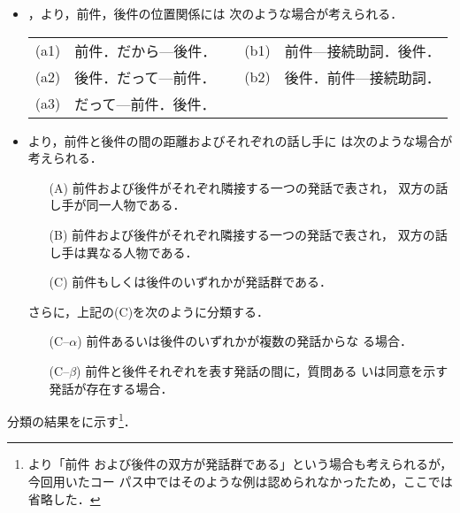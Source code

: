 \begin{itemize}
 \item {}，より，前件，後件の位置関係には
       次のような場合が考えられる．

       \begin{center}
	\begin{tabular}{rlcrl}
	 (a1) & 前件．だから---後件． & & (b1) & 前件---接続助詞．後件．
	 \\
	 (a2) & 後件．だって---前件． & & (b2) & 後件．前件---接続助詞．
	 \\
	 (a3) & だって---前件．後件． & & &
	\end{tabular}
       \end{center}

 \item {}より，前件と後件の間の距離およびそれぞれの話し手に
       は次のような場合が考えられる．

       \begin{itemize}
	\item[(A)] 前件および後件がそれぞれ隣接する一つの発話で表され，
		   双方の話し手が同一人物である．
	\item[(B)] 前件および後件がそれぞれ隣接する一つの発話で表され，
		   双方の話し手は異なる人物である．
	\item[(C)] 前件もしくは後件のいずれかが発話群である．
       \end{itemize}

       さらに，上記の(C)を次のように分類する．
       \begin{itemize}
	\item[(C--$\alpha$)] 前件あるいは後件のいずれかが複数の発話からな
			     る場合．
	\item[(C--$\beta$)] 前件と後件それぞれを表す発話の間に，質問ある
			     いは同意を示す発話が存在する場合．
       \end{itemize}
\end{itemize}

分類の結果をに示す\footnote{より「前件
および後件の双方が発話群である」という場合も考えられるが，今回用いたコー
パス中ではそのような例は認められなかったため，ここでは省略した．}．

